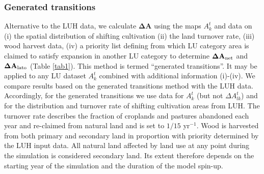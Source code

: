 \subsubsection*{Generated transitions}
Alternative to the LUH data, we calculate  $\mathbf{\Delta A}$ using the maps $A_k^t$ and data on (i) the spatial distribution of shifting cultivation (ii) the land turnover rate, (iii) wood harvest data, (iv) a priority list defining from which LU category area is claimed to satisfy expansion in another LU category to determine $\mathbf{\Delta A}_{\mbox{\scriptsize net}}$ and $\mathbf{\Delta A}_{\mbox{\scriptsize lato}}$ (Table \ref{tab1}). This method is termed ``generated transitions''. It may be applied to any LU dataset $A_k^t$ combined with additional information (i)-(iv). We compare results based on the generated transitions method with the LUH data. Accordingly, for the generated transitions we use data for $A_k^t$ (but not $\Delta A_{lk}^t$) and for the distribution and turnover rate of shifting cultivation areas from LUH. The turnover rate describes the fraction of croplands and pastures abandoned each year and re-claimed from natural land and is set to $1/15$ yr$^{-1}$. Wood is harvested from both primary and secondary land in proportion with priority determined by the LUH input data. All natural land affected by land use at any point during the simulation is considered secondary land. Its extent therefore depends on the starting year of the simulation and the duration of the model spin-up. %
